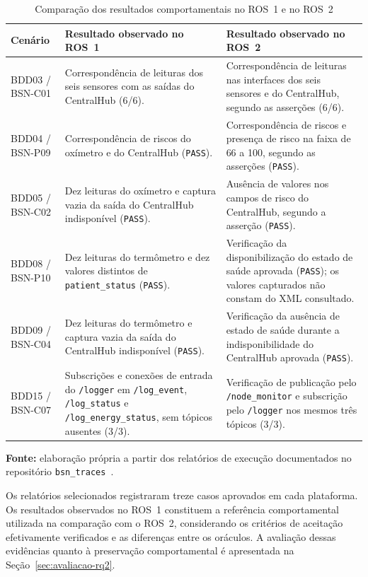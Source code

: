 \begin{table}[htbp]
\centering
\footnotesize
\caption{Comparação dos resultados comportamentais no ROS~1 e no ROS~2}
\label{tab:gt-validacao-amostra}
\begin{tabularx}{\textwidth}{@{}p{}XX@{}}
\toprule
\textbf{Cenário} & \textbf{Resultado observado no ROS~1} & \textbf{Resultado observado no ROS~2} \\
\midrule
BDD03 / BSN-C01 & Correspondência de leituras dos seis sensores com as saídas do CentralHub (6/6). & Correspondência de leituras nas interfaces dos seis sensores e do CentralHub, segundo as asserções (6/6). \\
\addlinespace
BDD04 / BSN-P09 & Correspondência de riscos do oxímetro e do CentralHub (\texttt{PASS}). & Correspondência de riscos e presença de risco na faixa de 66 a 100, segundo as asserções (\texttt{PASS}). \\
\addlinespace
BDD05 / BSN-C02 & Dez leituras do oxímetro e captura vazia da saída do CentralHub indisponível (\texttt{PASS}). & Ausência de valores nos campos de risco do CentralHub, segundo a asserção (\texttt{PASS}). \\
\addlinespace
BDD08 / BSN-P10 & Dez leituras do termômetro e dez valores distintos de \texttt{patient\_status} (\texttt{PASS}). & Verificação da disponibilização do estado de saúde aprovada (\texttt{PASS}); os valores capturados não constam do XML consultado. \\
\addlinespace
BDD09 / BSN-C04 & Dez leituras do termômetro e captura vazia da saída do CentralHub indisponível (\texttt{PASS}). & Verificação da ausência de estado de saúde durante a indisponibilidade do CentralHub aprovada (\texttt{PASS}). \\
\addlinespace
BDD15 / BSN-C07 & Subscrições e conexões de entrada do \texttt{/logger} em \texttt{/log\_event}, \texttt{/log\_status} e \texttt{/log\_energy\_status}, sem tópicos ausentes (3/3). & Verificação de publicação pelo \texttt{/node\_monitor} e subscrição pelo \texttt{/logger} nos mesmos três tópicos (3/3). \\
\bottomrule
\end{tabularx}
\par\smallskip
{\footnotesize\textbf{Fonte:} elaboração própria a partir dos relatórios de execução documentados no repositório \texttt{bsn\_traces}~\cite{Viana}.}
\end{table}
\FloatBarrier

Os relatórios selecionados registraram treze casos aprovados em cada plataforma. Os resultados observados no ROS~1 constituem a referência comportamental utilizada na comparação com o ROS~2, considerando os critérios de aceitação efetivamente verificados e as diferenças entre os oráculos. A avaliação dessas evidências quanto à preservação comportamental é apresentada na Seção~\ref{sec:avaliacao-rq2}.

